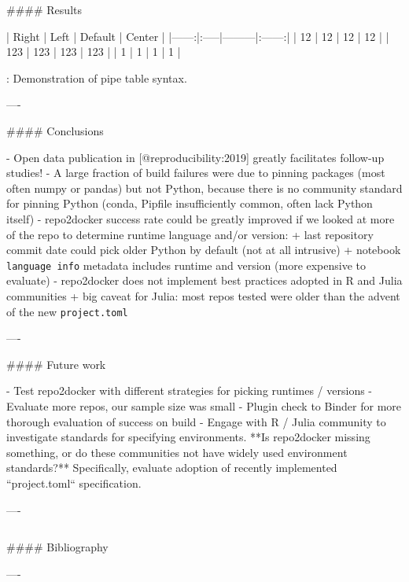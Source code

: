 \documentclass{beamer}
\begin{document}
\begin{frame}[fragile]
\begin{columns}[T]
\begin{column}{.46\textwidth}
\begin{markdown}
#### Results




| Right | Left | Default | Center |
|------:|:-----|---------|:------:|
|  12   |  12  |  12     |   12   |
| 123   |  123 |   123   |  123   |
|   1   |    1 |     1   |    1   |

  : Demonstration of pipe table syntax.

----

#### Conclusions

- Open data publication in [@reproducibility:2019] greatly facilitates follow-up studies!
- A large fraction of build failures were due to pinning packages (most often numpy or pandas)
  but not Python, because there is no community standard for pinning Python (conda, Pipfile insufficiently common, often lack Python itself)
- repo2docker success rate could be greatly improved if we looked at more of the repo to determine runtime language and/or version:
    + last repository commit date could pick older Python by default (not at all intrusive)
    + notebook \texttt{language info} metadata includes runtime and version (more expensive to evaluate)
- repo2docker does not implement best practices adopted in R and Julia communities
    + big caveat for Julia: most repos tested were older than the advent of the new \texttt{project.toml}

----

#### Future work

- Test repo2docker with different strategies for picking runtimes / versions
- Evaluate more repos, our sample size was small
- Plugin check to Binder for more thorough evaluation of success on build
- Engage with R / Julia community to investigate standards for specifying environments.
  **Is repo2docker missing something, or do these communities not have widely used environment standards?** Specifically, evaluate adoption of recently implemented ``project.toml`` specification.

----

\end{markdown}
\end{column}
\end{columns}

\begin{markdown}


#### Bibliography




----

\end{markdown}

\end{frame}
\end{document}
